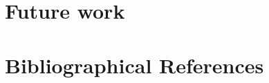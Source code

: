 \documentclass[10pt, a4paper]{article}
\begin{document}


\section{Future work}





\section{Bibliographical References}
\label{main:ref}




\end{document}
